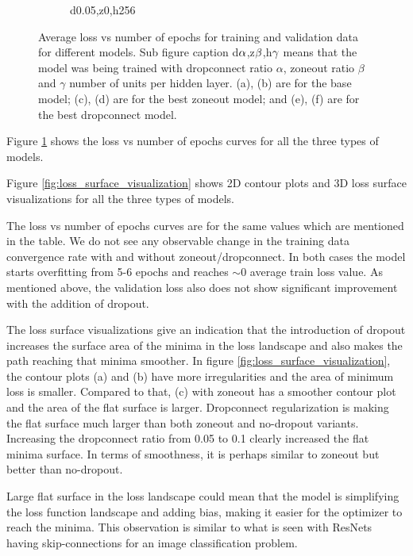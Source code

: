 \documentclass{article}
\begin{document}
\begin{figure}
\begin{subfigure}[b]{0.22\textwidth}
		\caption{d0.05,z0,h256}
	\end{subfigure}
	\caption{Average loss vs number of epochs for training and validation data for different models. Sub figure caption d$\bf{\alpha}$,z$\bf{\beta}$,h$\bf{\gamma}$ means that the model was being trained with dropconnect ratio $\alpha$, zoneout ratio $\beta$ and $\gamma$ number of units per hidden layer. (a), (b) are for the base model; (c), (d) are for the best zoneout model; and (e), (f) are for the best dropconnect model.}
	\label{fig:loss_epoch_curve}
\end{figure}

Figure \ref{fig:loss_epoch_curve} shows the loss vs number of epochs curves for all the three types of models.

Figure \ref{fig:loss_surface_visualization} shows 2D contour plots and 3D loss surface visualizations for all the three types of models.

The loss vs number of epochs curves are for the same values which are mentioned in the table. We do not see any observable change in the training data convergence rate with and without zoneout/dropconnect. In both cases the model starts overfitting from 5-6 epochs and reaches $\sim$0 average train loss value. As mentioned above, the validation loss also does not show significant improvement with the addition of dropout.


The loss surface visualizations give an indication that the introduction of dropout increases the surface area of the minima in the loss landscape and also makes the path reaching that minima smoother. In figure \ref{fig:loss_surface_visualization}, the contour plots (a) and (b) have more irregularities and the area of minimum loss is smaller. Compared to that, (c) with zoneout has a smoother contour plot and the area of the flat surface is larger. Dropconnect regularization is making the flat surface much larger than both zoneout and no-dropout variants. Increasing the dropconnect ratio from 0.05 to 0.1 clearly increased the flat minima surface. In terms of smoothness, it is perhaps similar to zoneout but better than no-dropout.

Large flat surface in the loss landscape could mean that the model is simplifying the loss function landscape and adding bias, making it easier for the optimizer to reach the minima. This observation is similar to what is seen with ResNets having skip-connections for an image classification problem.
\end{document}
